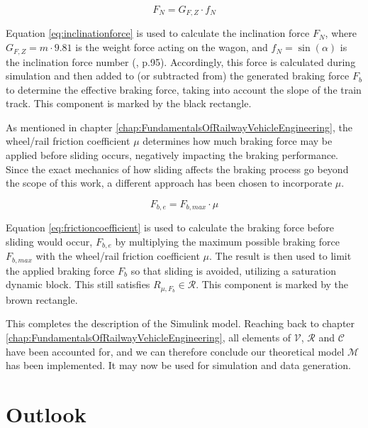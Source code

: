 \begin{equation}
\label{eq:inclinationforce}
F_{N} = G_{F,Z} \cdot f_{N}
\end{equation}

\noindent
Equation \ref{eq:inclinationforce} is used to calculate the inclination force $F_{N}$, where $G_{F,Z} = m \cdot 9.81$ is the weight force acting on the wagon, and $f_{N} = \sin(\alpha)$ is the inclination force number (\cite{Wende2003}, p.95). Accordingly, this force is calculated during simulation and then added to (or subtracted from) the generated braking force $F_{b}$ to determine the effective braking force, taking into account the slope of the train track. This component is marked by the black rectangle.
\par
As mentioned in chapter \ref{chap:FundamentalsOfRailwayVehicleEngineering}, the wheel/rail friction coefficient $\mu$ determines how much braking force may be applied before sliding occurs, negatively impacting the braking performance. Since the exact mechanics of how sliding affects the braking process go beyond the scope of this work, a different approach has been chosen to incorporate $\mu$.

\begin{equation}
\label{eq:frictioncoefficient}
F_{b,e} = F_{b,max} \cdot \mu
\end{equation}

\noindent
Equation \ref{eq:frictioncoefficient} is used to calculate the braking force before sliding would occur, $F_{b,e}$ by multiplying the maximum possible braking force $F_{b,max}$ with the wheel/rail friction coefficient $\mu$. The result is then used to limit the applied braking force $F_{b}$ so that sliding is avoided, utilizing a saturation dynamic block. This still satisfies $R_{\mu,F_{b}} \in {\mathcal{R}}$. This component is marked by the brown rectangle.
\bigskip
\par\noindent
This completes the description of the Simulink model. Reaching back to chapter \ref{chap:FundamentalsOfRailwayVehicleEngineering}, all elements of ${\mathcal{V}}$, ${\mathcal{R}}$ and ${\mathcal {C}}$ have been accounted for, and we can therefore conclude our theoretical model ${\mathcal{M}}$ has been implemented. It may now be used for simulation and data generation.

\section{Outlook}
\label{sec:Outlook}

